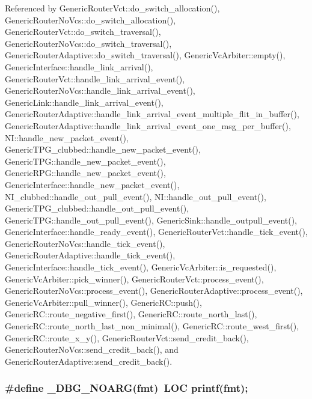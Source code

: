 Referenced by GenericRouterVct::do\_\-switch\_\-allocation(), GenericRouterNoVcs::do\_\-switch\_\-allocation(), GenericRouterVct::do\_\-switch\_\-traversal(), GenericRouterNoVcs::do\_\-switch\_\-traversal(), GenericRouterAdaptive::do\_\-switch\_\-traversal(), GenericVcArbiter::empty(), GenericInterface::handle\_\-link\_\-arrival(), GenericRouterVct::handle\_\-link\_\-arrival\_\-event(), GenericRouterNoVcs::handle\_\-link\_\-arrival\_\-event(), GenericLink::handle\_\-link\_\-arrival\_\-event(), GenericRouterAdaptive::handle\_\-link\_\-arrival\_\-event\_\-multiple\_\-flit\_\-in\_\-buffer(), GenericRouterAdaptive::handle\_\-link\_\-arrival\_\-event\_\-one\_\-msg\_\-per\_\-buffer(), NI::handle\_\-new\_\-packet\_\-event(), GenericTPG\_\-clubbed::handle\_\-new\_\-packet\_\-event(), GenericTPG::handle\_\-new\_\-packet\_\-event(), GenericRPG::handle\_\-new\_\-packet\_\-event(), GenericInterface::handle\_\-new\_\-packet\_\-event(), NI\_\-clubbed::handle\_\-out\_\-pull\_\-event(), NI::handle\_\-out\_\-pull\_\-event(), GenericTPG\_\-clubbed::handle\_\-out\_\-pull\_\-event(), GenericTPG::handle\_\-out\_\-pull\_\-event(), GenericSink::handle\_\-outpull\_\-event(), GenericInterface::handle\_\-ready\_\-event(), GenericRouterVct::handle\_\-tick\_\-event(), GenericRouterNoVcs::handle\_\-tick\_\-event(), GenericRouterAdaptive::handle\_\-tick\_\-event(), GenericInterface::handle\_\-tick\_\-event(), GenericVcArbiter::is\_\-requested(), GenericVcArbiter::pick\_\-winner(), GenericRouterVct::process\_\-event(), GenericRouterNoVcs::process\_\-event(), GenericRouterAdaptive::process\_\-event(), GenericVcArbiter::pull\_\-winner(), GenericRC::push(), GenericRC::route\_\-negative\_\-first(), GenericRC::route\_\-north\_\-last(), GenericRC::route\_\-north\_\-last\_\-non\_\-minimal(), GenericRC::route\_\-west\_\-first(), GenericRC::route\_\-x\_\-y(), GenericRouterVct::send\_\-credit\_\-back(), GenericRouterNoVcs::send\_\-credit\_\-back(), and GenericRouterAdaptive::send\_\-credit\_\-back().
\subsubsection[{\_\-DBG\_\-NOARG}]{\setlength{\rightskip}{0pt plus 5cm}\#define \_\-DBG\_\-NOARG(fmt)~LOC printf(fmt);}\label{genericComponentHeader_8h_34e0f121e3b717b1a15c6f90dae9f5d5}




